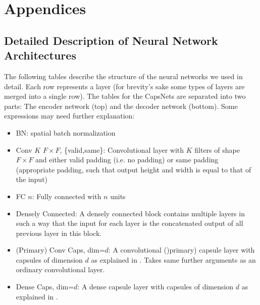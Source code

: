 \appendix
\section*{Appendices}
\renewcommand{\thesubsection}{\Alph{subsection}}

\subsection{Detailed Description of Neural Network Architectures}
\label{lab:networks}

The following tables describe the structure of the neural networks we used in detail. Each row represents a layer (for brevity's sake some types of layers are merged into a single row).
The tables for the CapsNets are separated into two parts: The encoder network (top) and the decoder network (bottom).
Some expressions may need further explanation:

\begin{itemize}
	\item BN: spatial batch normalization
	\item Conv $K$ $F \times F$, \{valid,same\}: Convolutional layer with $K$ filters of shape $F \times F$ and either valid padding (i.e. no padding) or same padding (appropriate padding, such that output height and width is equal to that of the input)
	\item FC $n$: Fully connected with $n$ units
	\item Densely Connected: A densely connected block \citep{denselyconnected} contains multiple layers in such a way that the input for each layer is the concatenated output of all previous layer in this block.
	\item (Primary) Conv Caps, dim=$d$: A convolutional ()primary) capsule layer with capsules of dimension $d$ as explained in . Takes same further arguments as an ordinary convolutional layer.
	\item Dense Caps, dim=$d$: A dense capsule layer with capsules of dimension $d$ as explained in .
\end{itemize}

